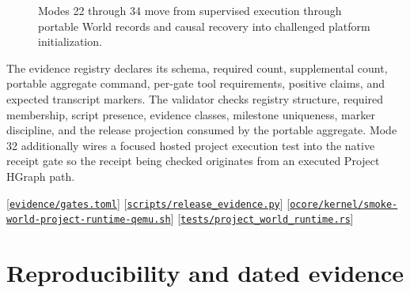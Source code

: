 \documentclass[11pt,oneside]{article}
\newcommand{\src}[1]{\textcolor{OSlate}{\scriptsize[\href{https://github.com/lostadi/OSTADIX/blob/c0b02c326b2329a95ba52447c7180bc93957cd57/#1}{\nolinkurl{#1}}]}\allowbreak}
\begin{document}
\begin{figure}[htbp]
\centering
{}
\caption{Modes 22 through 34 move from supervised execution through portable
World records and causal recovery into challenged platform initialization.}
\label{fig:modes22-34}
\end{figure}

The evidence registry declares its schema, required count, supplemental count,
portable aggregate command, per-gate tool requirements, positive claims, and
expected transcript markers. The validator checks registry structure,
required membership, script presence, evidence classes, milestone uniqueness,
marker discipline, and the release projection consumed by the portable
aggregate. Mode 32 additionally wires a focused hosted project execution test
into the native receipt gate so the receipt being checked originates from an
executed Project HGraph path.

\src{evidence/gates.toml}
\src{scripts/release_evidence.py}
\src{ocore/kernel/smoke-world-project-runtime-qemu.sh}
\src{tests/project_world_runtime.rs}


\section{Reproducibility and dated evidence}
\label{sec:validation}
\end{document}
